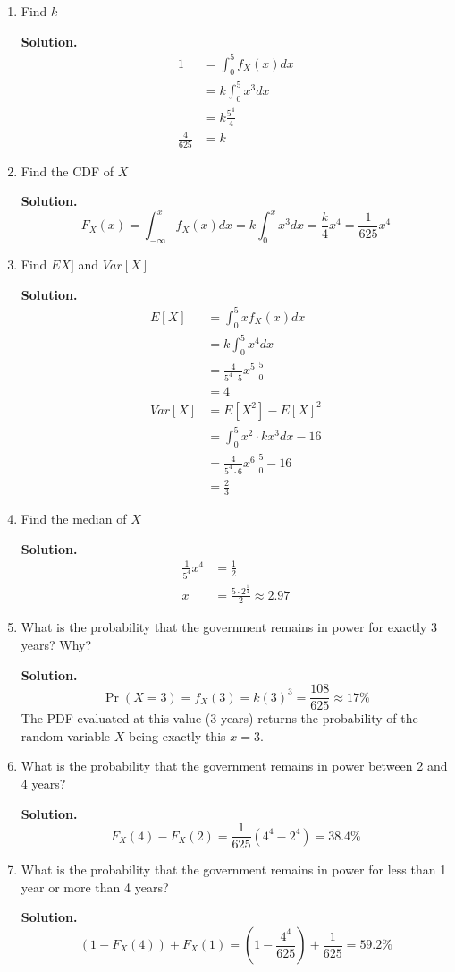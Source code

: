 \documentclass[12pt]{article}
\begin{document}
\begin{enumerate}
    \item Find $k$

    \textbf{Solution.} 
    \begin{align*}
        1 &= \int_0^5 f_X(x)dx 
        \\ &= k\int_0^5 x^3dx
        \\ &= k \frac{5^4}{4}
        \\ \frac{4}{625} &= k
    \end{align*}

    \item Find the CDF of $X$

    \textbf{Solution.} 
    \[ F_X(x) = \int_{-\infty}^x f_X(x) dx = k\int_0^x x^3dx = \frac{k}{4}x^4 = \frac{1}{625}x^4\]

    \item Find $EX]$ and $Var[X]$

    \textbf{Solution.}
    \begin{align*}
        E[X] &= \int_0^5 xf_X(x)dx 
        \\ &= k\int_0^5 x^4 dx 
        \\ &= \frac{4}{5^4 \cdot 5}x^5 \bigg|_0^5 
        \\ &= 4
        \\ Var[X] &= E[X^2] - E[X]^2 
        \\ &= \int_0^5 x^2 \cdot kx^3 dx - 16 
        \\ &= \frac{4}{5^4\cdot 6}x^6 \bigg|_0^5 -16
        \\ &= \frac{2}{3}
    \end{align*}

    \item Find the median of $X$

    \textbf{Solution.}
    \begin{align*}
        \frac{1}{5^4}x^4 &= \frac{1}{2}
        \\ x &= \frac{5\cdot 2^{\frac{1}{4}}}{2} \approx 2.97
    \end{align*}

    \item What is the probability that the government remains in power for exactly 3 years? Why?
    
        \textbf{Solution.}
        \[ \Pr(X=3) = f_X(3) = k(3)^3 = \frac{108}{625} \approx 17\%\]
        The PDF evaluated at this value (3 years) returns the probability of the random variable $X$ being exactly this $x=3$.

    \item What is the probability that the government remains in power between 2 and 4 years?
    
    \textbf{Solution.}
    \[ F_X(4) - F_X(2) = \frac{1}{625}(4^4 - 2^4) = 38.4\% \]

    \item What is the probability that the government remains in power for less than 1 year or more than 4 years?

    \textbf{Solution.}
    \[ (1- F_X(4)) + F_X(1) = (1-\frac{4^4}{625}) + \frac{1}{625} = 59.2\%\]
\end{enumerate}
\end{document}

